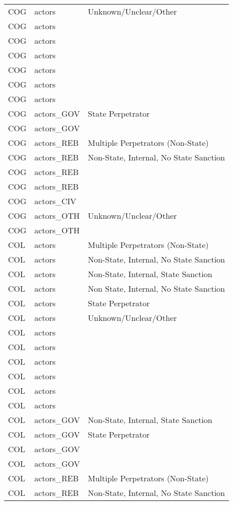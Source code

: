 \begin{table}[ht]
\begin{tabular}{lll}
  COG & actors & Unknown/Unclear/Other \\ 
  COG & actors &  \\ 
  COG & actors &  \\ 
  COG & actors &  \\ 
  COG & actors &  \\ 
  COG & actors &  \\ 
  COG & actors &  \\ 
  COG & actors\_GOV & State Perpetrator \\ 
  COG & actors\_GOV &  \\ 
  COG & actors\_REB & Multiple Perpetrators (Non-State) \\ 
  COG & actors\_REB & Non-State, Internal, No State Sanction \\ 
  COG & actors\_REB &  \\ 
  COG & actors\_REB &  \\ 
  COG & actors\_CIV &  \\ 
  COG & actors\_OTH & Unknown/Unclear/Other \\ 
  COG & actors\_OTH &  \\ 
  COL & actors & Multiple Perpetrators (Non-State) \\ 
  COL & actors & Non-State, Internal, No State Sanction \\ 
  COL & actors & Non-State, Internal, State Sanction \\ 
  COL & actors & Non State, Internal, No State Sanction \\ 
  COL & actors & State Perpetrator \\ 
  COL & actors & Unknown/Unclear/Other \\ 
  COL & actors &  \\ 
  COL & actors &  \\ 
  COL & actors &  \\ 
  COL & actors &  \\ 
  COL & actors &  \\ 
  COL & actors &  \\ 
  COL & actors\_GOV & Non-State, Internal, State Sanction \\ 
  COL & actors\_GOV & State Perpetrator \\ 
  COL & actors\_GOV &  \\ 
  COL & actors\_GOV &  \\ 
  COL & actors\_REB & Multiple Perpetrators (Non-State) \\ 
  COL & actors\_REB & Non-State, Internal, No State Sanction \\ 

\end{tabular}
\end{table}
